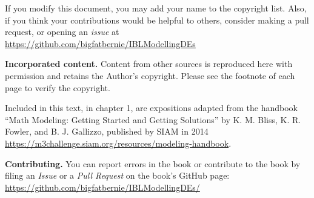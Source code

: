 If you modify this document, you may add your name to the copyright list. Also,
if you think your contributions would be helpful to others, consider making a
pull request, or opening an \emph{issue} at \url{https://github.com/bigfatbernie/IBLModellingDEs}

{\bf Incorporated content.}
Content from other sources is reproduced here with permission and retains the Author's copyright. Please see the footnote of each page to verify the copyright.

Included in this text, in chapter 1, are expositions adapted from the handbook ``Math Modeling: Getting Started and Getting Solutions'' by K. M. Bliss, K. R. Fowler, and B. J. Gallizzo, published by SIAM in 2014 \url{https://m3challenge.siam.org/resources/modeling-handbook}.

{\bf Contributing.} You can report errors in the book or contribute to the book by filing an \emph{Issue} or a \emph{Pull Request} on the book's GitHub page: \url{https://github.com/bigfatbernie/IBLModellingDEs/}







